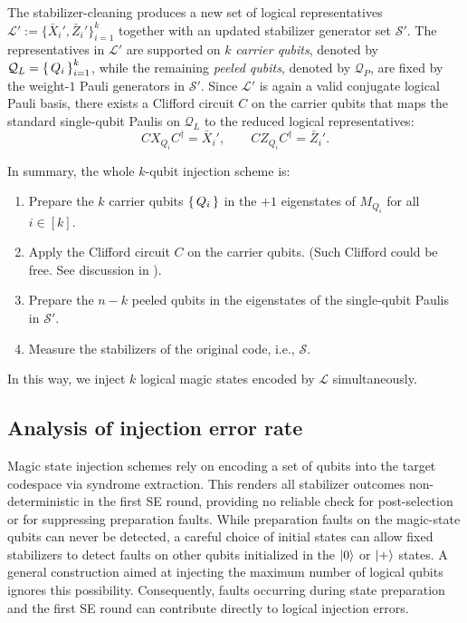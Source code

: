 The stabilizer-cleaning produces a new set of logical representatives $ \mathcal{L}' := \{ \bar{X}_i', \bar{Z}_i' \}_{i=1}^{k} $ together with an updated stabilizer generator set $ \mathcal{S}' $. The representatives in $ \mathcal{L}' $ are supported on $ k $ \emph{carrier qubits}, denoted by $\mathcal{Q}_L = \set{Q_i}_{i=1}^k$, while the remaining \emph{peeled qubits}, denoted by $\mathcal{Q}_P$, are fixed by the weight-$1$ Pauli generators in $ \mathcal{S}' $.
Since $ \mathcal{L}' $ is again a valid conjugate logical Pauli basis, there exists a Clifford circuit $C$ on the carrier qubits that maps the standard single-qubit Paulis on $\mathcal{Q}_L$ to the reduced logical representatives:
\begin{equation}
C X_{Q_i} C^\dagger = \bar{X}_i',
\qquad
C Z_{Q_i} C^\dagger = \bar{Z}_i'.
\label{eq:tomas-step-clifford-circuit}
\end{equation}


In summary, the whole $ k $-qubit injection scheme is:
\begin{enumerate}
    \item Prepare the $ k $ carrier qubits $\set{Q_i}$ in the $+1$ eigenstates of $ M_{Q_i} $ for all $ i \in [k] $.
    \item Apply the Clifford circuit $C$ on the carrier qubits. (Such Clifford could be free. See discussion in ).
    \item Prepare the $ n-k $ peeled qubits in the eigenstates of the single-qubit Paulis in $ \mathcal{S}' $.
    \item Measure the stabilizers of the original code, i.e., $ \mathcal{S} $.
\end{enumerate}

In this way, we inject $ k $ logical magic states encoded by $ \mathcal{L} $ simultaneously.

\subsection{Analysis of injection error rate}

Magic state injection schemes rely on encoding a set of qubits into the target codespace via syndrome extraction. This renders all stabilizer outcomes non-deterministic in the first SE round, providing no reliable check for post-selection or for suppressing preparation faults. While preparation faults on the magic-state qubits can never be detected, a careful choice of initial states can allow fixed stabilizers to detect faults on other qubits initialized in the $\ket{0}$ or $\ket{+}$ states. A general construction aimed at injecting the maximum number of logical qubits ignores this possibility. Consequently, faults occurring during state preparation and the first SE round can contribute directly to logical injection errors.


